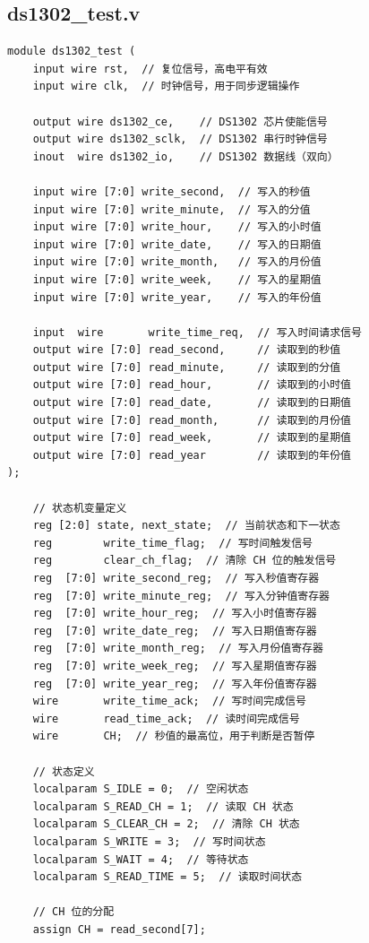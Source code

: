 \documentclass[a4paper,10pt]{article}
\begin{document}
\subsection{ds1302_test.v}
\begin{lstlisting}[caption=ds1302_test.v]
module ds1302_test (
    input wire rst,  // 复位信号，高电平有效
    input wire clk,  // 时钟信号，用于同步逻辑操作

    output wire ds1302_ce,    // DS1302 芯片使能信号
    output wire ds1302_sclk,  // DS1302 串行时钟信号
    inout  wire ds1302_io,    // DS1302 数据线（双向）

    input wire [7:0] write_second,  // 写入的秒值
    input wire [7:0] write_minute,  // 写入的分值
    input wire [7:0] write_hour,    // 写入的小时值
    input wire [7:0] write_date,    // 写入的日期值
    input wire [7:0] write_month,   // 写入的月份值
    input wire [7:0] write_week,    // 写入的星期值
    input wire [7:0] write_year,    // 写入的年份值

    input  wire       write_time_req,  // 写入时间请求信号
    output wire [7:0] read_second,     // 读取到的秒值
    output wire [7:0] read_minute,     // 读取到的分值
    output wire [7:0] read_hour,       // 读取到的小时值
    output wire [7:0] read_date,       // 读取到的日期值
    output wire [7:0] read_month,      // 读取到的月份值
    output wire [7:0] read_week,       // 读取到的星期值
    output wire [7:0] read_year        // 读取到的年份值
);

    // 状态机变量定义
    reg [2:0] state, next_state;  // 当前状态和下一状态
    reg        write_time_flag;  // 写时间触发信号
    reg        clear_ch_flag;  // 清除 CH 位的触发信号
    reg  [7:0] write_second_reg;  // 写入秒值寄存器
    reg  [7:0] write_minute_reg;  // 写入分钟值寄存器
    reg  [7:0] write_hour_reg;  // 写入小时值寄存器
    reg  [7:0] write_date_reg;  // 写入日期值寄存器
    reg  [7:0] write_month_reg;  // 写入月份值寄存器
    reg  [7:0] write_week_reg;  // 写入星期值寄存器
    reg  [7:0] write_year_reg;  // 写入年份值寄存器
    wire       write_time_ack;  // 写时间完成信号
    wire       read_time_ack;  // 读时间完成信号
    wire       CH;  // 秒值的最高位，用于判断是否暂停

    // 状态定义
    localparam S_IDLE = 0;  // 空闲状态
    localparam S_READ_CH = 1;  // 读取 CH 状态
    localparam S_CLEAR_CH = 2;  // 清除 CH 状态
    localparam S_WRITE = 3;  // 写时间状态
    localparam S_WAIT = 4;  // 等待状态
    localparam S_READ_TIME = 5;  // 读取时间状态

    // CH 位的分配
    assign CH = read_second[7];


\end{lstlisting}
\end{document}
